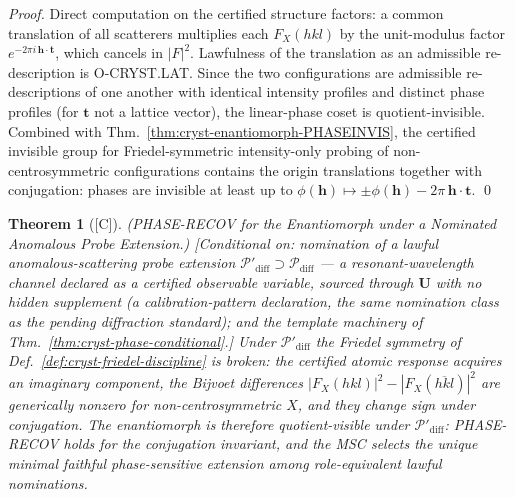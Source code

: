 \documentclass[12pt,oneside]{amsbook}
\theoremstyle{plain}
\newtheorem{theorem}{Theorem}[section]
\theoremstyle{definition}
\theoremstyle{remark}
\newcommand{\status}[1]{\textup{[#1]}}
\begin{document}
\begin{proof}
Direct computation on the certified structure factors: a common
translation of all scatterers multiplies each $F_X(hkl)$ by the
unit-modulus factor $e^{-2\pi i\,\mathbf{h}\cdot\mathbf{t}}$,
which cancels in $|F|^2$.  Lawfulness of the translation as an
admissible re-description is O-CRYST.LAT.  Since the two
configurations are admissible re-descriptions of one another with
identical intensity profiles and distinct phase profiles (for
$\mathbf{t}$ not a lattice vector), the linear-phase coset is
quotient-invisible.  Combined with
Thm.~\ref{thm:cryst-enantiomorph-PHASEINVIS}, the certified
invisible group for Friedel-symmetric intensity-only probing of
non-centrosymmetric configurations contains the origin
translations together with conjugation: phases are invisible at
least up to $\phi(\mathbf{h}) \mapsto \pm\phi(\mathbf{h}) -
2\pi\,\mathbf{h}\cdot\mathbf{t}$. \qed
\end{proof}

\begin{theorem}[\status{C}]\label{thm:cryst-anomalous-PHASERECOV}
\textup{(PHASE-RECOV for the Enantiomorph under a Nominated
Anomalous Probe Extension.)}
\textup{[Conditional on: nomination of a lawful
\emph{anomalous-scattering probe extension}
$\mathcal{P}'_{\mathrm{diff}} \supset \mathcal{P}_{\mathrm{diff}}$
--- a resonant-wavelength channel declared as a certified
observable variable, sourced through $\mathbf{U}$ with no hidden
supplement (a calibration-pattern declaration, the same nomination
class as the pending diffraction standard); and the template
machinery of Thm.~\ref{thm:cryst-phase-conditional}.]}
Under $\mathcal{P}'_{\mathrm{diff}}$ the Friedel symmetry of
Def.~\ref{def:cryst-friedel-discipline} is broken: the certified
atomic response acquires an imaginary component, the Bijvoet
differences $|F_X(hkl)|^2 - |F_X(\overline{hkl})|^2$ are
generically nonzero for non-centrosymmetric $X$, and they change
sign under conjugation.  The enantiomorph is therefore
quotient-visible under $\mathcal{P}'_{\mathrm{diff}}$: PHASE-RECOV
holds for the conjugation invariant, and the MSC selects the
unique minimal faithful phase-sensitive extension among
role-equivalent lawful nominations.
\end{theorem}
\end{document}

